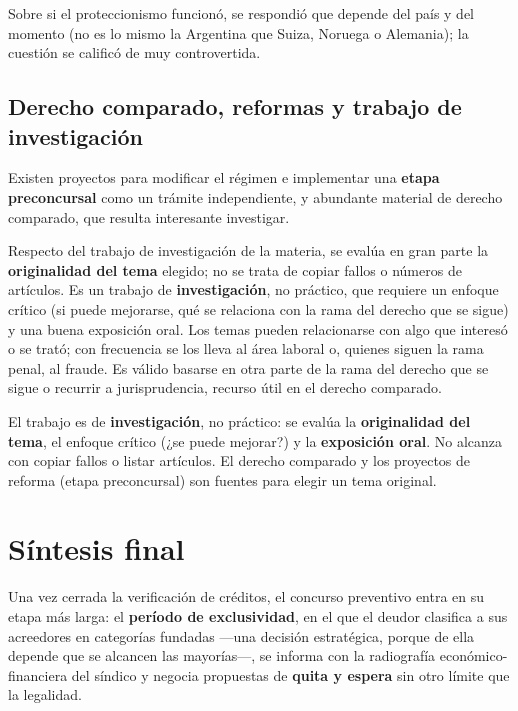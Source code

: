\documentclass[12pt,oneside]{book}
\begin{document}
Sobre si el proteccionismo funcionó, se respondió que depende del país y del momento (no es lo mismo la Argentina que Suiza, Noruega o Alemania); la cuestión se calificó de muy controvertida.

\section{Derecho comparado, reformas y trabajo de investigación}

Existen proyectos para modificar el régimen e implementar una \textbf{etapa preconcursal} como un trámite independiente, y abundante material de derecho comparado, que resulta interesante investigar.

Respecto del trabajo de investigación de la materia, se evalúa en gran parte la \textbf{originalidad del tema} elegido; no se trata de copiar fallos o números de artículos. Es un trabajo de \textbf{investigación}, no práctico, que requiere un enfoque crítico (si puede mejorarse, qué se relaciona con la rama del derecho que se sigue) y una buena exposición oral. Los temas pueden relacionarse con algo que interesó o se trató; con frecuencia se los lleva al área laboral o, quienes siguen la rama penal, al fraude. Es válido basarse en otra parte de la rama del derecho que se sigue o recurrir a jurisprudencia, recurso útil en el derecho comparado.

\begin{important}
El trabajo es de \textbf{investigación}, no práctico: se evalúa la \textbf{originalidad del tema}, el enfoque crítico (¿se puede mejorar?) y la \textbf{exposición oral}. No alcanza con copiar fallos o listar artículos. El derecho comparado y los proyectos de reforma (etapa preconcursal) son fuentes para elegir un tema original.
\end{important}

\chapter{Síntesis final}

Una vez cerrada la verificación de créditos, el concurso preventivo entra en su etapa más larga: el \textbf{período de exclusividad}, en el que el deudor clasifica a sus acreedores en categorías fundadas ---una decisión estratégica, porque de ella depende que se alcancen las mayorías---, se informa con la radiografía económico-financiera del síndico y negocia propuestas de \textbf{quita y espera} sin otro límite que la legalidad.
\end{document}
